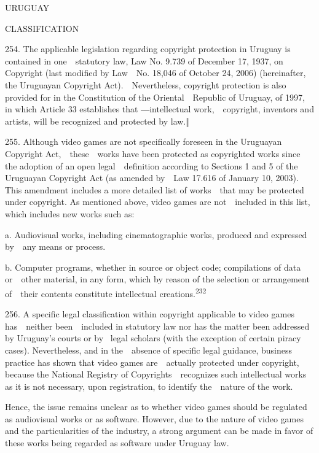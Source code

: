 \documentclass[
]{article}
\begin{document}
{URUGUAY}

{CLASSIFICATION}

{254. }{The applicable legislation regarding copyright protection in
Uruguay is contained in one~~statutory law, }{Law No. 9.739 of December
17, 1937, on Copyright }{(last modified by Law~~No. 18,046 of October
24, 2006) (hereinafter, the Uruguayan }{Copyright Act}{).~~Nevertheless,
copyright protection is also provided for in the }{Constitution of the
Oriental~~Republic of Uruguay}{, of 1997, in which Article 33
establishes that ―}{intellectual work,~~copyright, inventors and
artists, will be recognized and protected by law.}{‖}

{255. }{Although video games are not specifically foreseen in the
Uruguayan }{Copyright Act}{,~~these~~works have been protected as
copyrighted works since the adoption of an open legal~~definition
according to Sections 1 and 5 of the Uruguayan }{Copyright Act }{(as
amended by~~Law 17.616 of January 10, 2003). This amendment includes a
more detailed list of works~~that may be protected under copyright. As
mentioned above, video games are not~~included in this list, which
includes new works such as:}

{a. Audiovisual works, including cinematographic works, produced and
expressed by~~any means or process.}

{b. Computer programs, whether in source or object code; compilations of
data or~~other material, in any form, which by reason of the selection
or arrangement of~~their contents constitute intellectual
creations.}\textsuperscript{{232}}

{256. }{A specific legal classification within copyright applicable to
video games has~~neither been~~included in statutory law nor has the
matter been addressed by }{Uruguay's courts or by }{~legal scholars
(with the exception of certain piracy cases). Nevertheless, and in
the~~absence of specific legal guidance, business practice has shown
that video games are~~actually protected under copyright, because the
National Registry of Copyrights~~recognizes such intellectual works as
it is not necessary, upon registration, to identify the~~nature of the
work.}

{Hence, the issue remains unclear as to whether video games should be
regulated as audiovisual works or as software. However, due to the
nature of video games and the particularities of the industry, a strong
argument can be made in favor of these works being regarded as software
under Uruguay law.}
\end{document}
